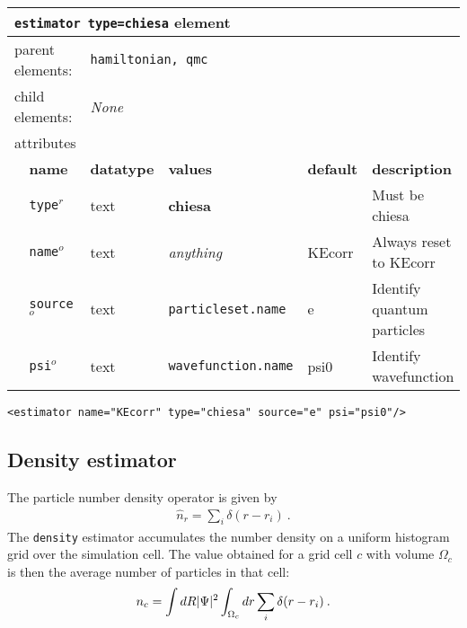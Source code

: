 \FloatBarrier
\begin{table}[h]
\begin{center}
\begin{tabularx}{\textwidth}{l l l l l X }
\hline
\multicolumn{6}{l}{\texttt{estimator type=chiesa} element} \\
\hline
\multicolumn{2}{l}{parent elements:} & \multicolumn{4}{l}{\texttt{hamiltonian, qmc}}\\
\multicolumn{2}{l}{child  elements:} & \multicolumn{4}{l}{\textit{None}}\\
\multicolumn{2}{l}{attributes}  & \multicolumn{4}{l}{}\\
   &   \bfseries name     & \bfseries datatype & \bfseries values & \bfseries default   & \bfseries description \\
   & \texttt{type}$^r$    &  text              & \textbf{chiesa}            &        & Must be chiesa         \\
   & \texttt{name}$^o$    &  text              & \textit{anything}          & KEcorr & Always reset to KEcorr \\
   & \texttt{source}$^o$  &  text              & \texttt{particleset.name}  & e      & Identify quantum particles\\
   & \texttt{psi}$^o$     &  text              & \texttt{wavefunction.name} & psi0   & Identify wavefunction  \\
  \hline
\end{tabularx}
\end{center}
\end{table}
\FloatBarrier

\begin{lstlisting}[style=QMCPXML,caption=``Chiesa'' kinetic energy finite-size postcorrection.]
   <estimator name="KEcorr" type="chiesa" source="e" psi="psi0"/>
\end{lstlisting}




\subsection{Density estimator}
The particle number density operator is given by
\begin{align}
  \hat{n}_r = \sum_i\delta(r-r_i)\:.
\end{align}
The \texttt{density} estimator accumulates the number density on a uniform histogram grid over the simulation cell.  The value obtained for a grid cell $c$ with volume $\Omega_c$ is then the average number of particles in that cell:
\begin{align}
  n_c = \int dR \lvert \Psi \rvert^2 \int_{\Omega_c}dr \sum_i\delta(r-r_i)\:.
\end{align}  


